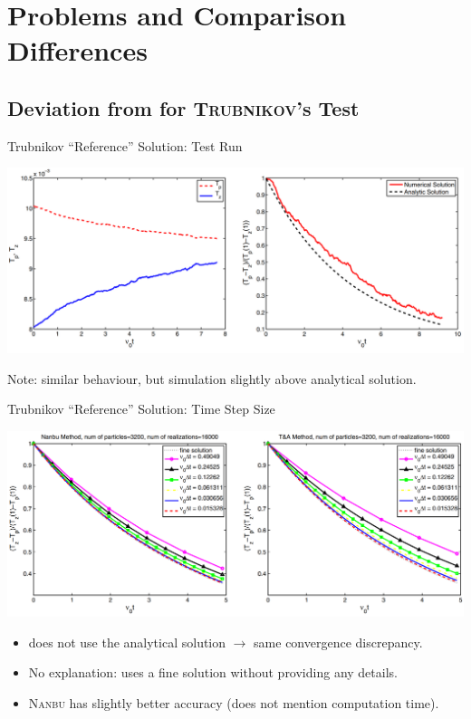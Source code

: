 \section{Problems and Comparison Differences}

\subsection{Deviation from \cite{Wang2008} for \textsc{Trubnikov}'s Test}

\begin{frame}{Trubnikov ``Reference'' Solution: Test Run}
    \begin{minipage}{\textwidth}
        \centering
        \includegraphics[width=\textwidth]{ressources/test1/Wang_anisotropic.png}
    \end{minipage}
    Note: similar behaviour, but simulation slightly above analytical solution.
\end{frame}

\begin{frame}{Trubnikov ``Reference'' Solution: Time Step Size}
    \begin{minipage}{\textwidth}
        \centering
        \includegraphics[width=\textwidth]{ressources/test1/Wang_dT.png}
    \end{minipage}
    \begin{itemize}
        \item \cite{Wang2008} does not use the analytical solution $\rightarrow$ same convergence discrepancy.
        \item No explanation: uses a fine solution without providing any details. 
        \item \textsc{Nanbu} has slightly better accuracy (does not mention computation time).
    \end{itemize}
\end{frame}

